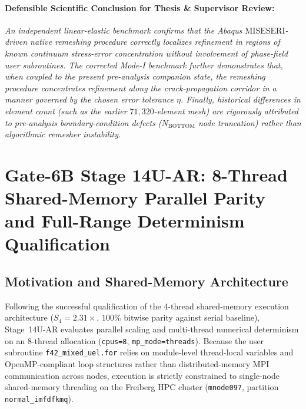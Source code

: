 \paragraph{Defensible Scientific Conclusion for Thesis \& Supervisor Review:}
\textit{An independent linear-elastic benchmark confirms that the Abaqus $\mathrm{MISESERI}$-driven native remeshing procedure correctly localizes refinement in regions of known continuum stress-error concentration without involvement of phase-field user subroutines. The corrected Mode-I benchmark further demonstrates that, when coupled to the present pre-analysis companion state, the remeshing procedure concentrates refinement along the crack-propagation corridor in a manner governed by the chosen error tolerance $\eta$. Finally, historical differences in element count (such as the earlier $71{,}320$-element mesh) are rigorously attributed to pre-analysis boundary-condition defects ($N_{\mathrm{BOTTOM}}$ node truncation) rather than algorithmic remesher instability.}

\section{Gate-6B Stage 14U-AR: 8-Thread Shared-Memory Parallel Parity and Full-Range Determinism Qualification}
\label{sec:stage14uar_8thread_parity_and_determinism}

\subsection{Motivation and Shared-Memory Architecture}
Following the successful qualification of the 4-thread shared-memory execution architecture ($S_4 = 2.31\times$, $100\%$ bitwise parity against serial baseline), Stage~14U-AR evaluates parallel scaling and multi-thread numerical determinism on an 8-thread allocation (\texttt{cpus=8}, \texttt{mp\_mode=threads}). Because the user subroutine \texttt{f42\_mixed\_uel.for} relies on module-level thread-local variables and OpenMP-compliant loop structures rather than distributed-memory MPI communication across nodes, execution is strictly constrained to single-node shared-memory threading on the Freiberg HPC cluster (\texttt{mnode097}, partition \texttt{normal\_imfdfkmq}).

